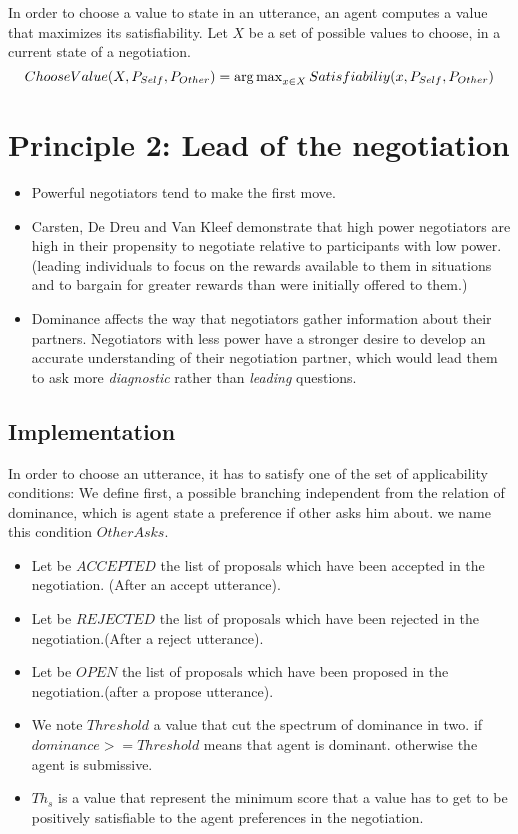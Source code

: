 \documentclass{article}
\begin{document}
	In order to choose a value to state in an utterance, an agent computes a value that maximizes its satisfiability. Let $X$ be a set of possible values to choose, in a current state of a negotiation. 
	\begin{dmath}
	$$ ChooseValue(X,P_{Self},P_{Other}) = \operatorname*{arg\,max}_{x \in X} Satisfiabiliy(x,P_{Self},P_{Other})$$ 
	\end{dmath}
	\section{Principle 2: Lead of the negotiation}
	
	
	\begin{itemize}
		\item Powerful negotiators tend to make the first move. %
	
		\item Carsten, De Dreu and Van Kleef demonstrate that high power negotiators are high in their propensity to negotiate relative to participants with low power. (leading individuals to focus on the rewards available to them in situations and to bargain for	greater rewards than were initially offered to them.)
	
		\item Dominance affects the way that negotiators gather information about their partners. Negotiators with less power have a stronger desire to develop an accurate understanding of their negotiation partner, which would lead them to ask more \emph{diagnostic} rather than \emph{leading} questions.
		
	\end{itemize} 
	

	
	\subsection{Implementation}
	In order to choose an utterance, it has to satisfy one of the set of applicability conditions:
	We define first, a possible branching independent from the relation of dominance, which is agent state a preference if other asks him about. we name this condition $OtherAsks$.
	
	\begin{itemize}
		\item Let be $ACCEPTED$ the list of proposals which have been accepted in the negotiation. (After an accept utterance).
		\item Let be $REJECTED$ the list of proposals which have been rejected in the negotiation.(After a reject utterance).
		\item Let be $OPEN$ the list of proposals which have been proposed in the negotiation.(after a propose utterance).
		\item We note $Threshold$ a value that cut the spectrum of dominance in two. if $dominance >= Threshold$ means that agent is dominant. otherwise the agent is submissive.
		\item $Th_s$ is a value that represent the minimum score that a value has to get to be positively satisfiable to the agent preferences in the negotiation.
	\end{itemize}
\end{document}
